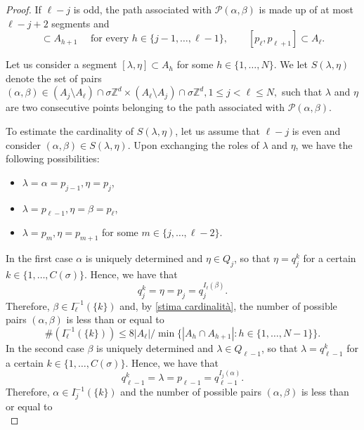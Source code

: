 \documentclass[10pt,a4paper]{amsart}
\def\ZZ{{\mathbb Z}}
\newcommand{\s}{\sigma}
\begin{document}
\begin{proof}
If $\ell-j$ is odd, the path associated with $\mathcal P(\alpha,\beta)$ is made up of at most $\ell-j+2$ segments and 
\begin{equation*}
  [p_h,p_{h+1}]\subset A_{h+1} \quad\text{ for every } h\in\{j-1,\dots, \ell-1\}, \qquad [p_{\ell},p_{\ell+1}]\subset A_\ell.
\end{equation*}

Let us consider a segment $[\lambda,\eta]\subset A_{h}$ for some $h\in\{1,\dots,N\}$. We let $S(\lambda,\eta)$ denote the set of pairs $(\alpha,\beta)\in(A_j\setminus A_\ell)\cap\s\ZZ^d\times (A_\ell\setminus A_j)\cap\s\ZZ^d, 1\leq j<\ell\leq N,$ such that $\lambda$ and $\eta$ are two consecutive points belonging to the path associated with $\mathcal{P}(\alpha,\beta)$. 

To estimate the cardinality of $S(\lambda,\eta)$, let us assume that $\ell-j$ is even and consider $(\alpha,\beta)\in S(\lambda,\eta)$.  Upon exchanging the roles of $\lambda$ and $\eta$, we have the following possibilities:
\begin{itemize}
    \item[(i)] $\lambda=\alpha=p_{j-1}, \eta=p_j$,
     \item[(ii)] $  \lambda=p_{\ell-1}, \eta=\beta=p_\ell$,
      \item[(iii)] $\lambda=p_m,  \eta=p_{m+1}$ for some $m\in\{j,\dots,\ell-2\}$.
\end{itemize}
In the first case $\alpha$ is uniquely determined and $\eta\in Q_j$, so that $\eta=q_j^{k}$ for a certain $k\in\{1,\dots, C(\s)\}$. Hence, we have that 
\begin{equation*}
q_j^k=\eta=p_j=q^{I_\ell(\beta)}_j.    
\end{equation*}
Therefore, $\beta\in I_\ell^{-1}(\{k\})$ and, by \eqref{stima cardinalità}, the number of possible pairs $(\alpha,\beta)$ is less than or equal to 
\begin{equation*}
    \#(I_\ell^{-1}(\{k\})) \leq 8|A_\ell|/\min\{|A_h\cap A_{h+1}| :  h\in\{1,\dots, N-1\}\}.
\end{equation*}
In the second case $\beta$ is uniquely determined and $\lambda\in Q_{\ell-1}$, so that $\lambda=q_{\ell-1}^{k}$ for a certain $k\in\{1,\dots, C(\s)\}$. Hence, we have that 
\begin{equation*}
    q_{\ell-1}^{k}= \lambda=p_{\ell-1}=q^{I_j(\alpha)}_{\ell-1}.
\end{equation*}
Therefore, $\alpha\in I_j^{-1}(\{k\})$ and the number of possible pairs $(\alpha,\beta)$ is less than or equal to 
\begin{equation*}

\end{equation*}
\end{proof}
\end{document}
